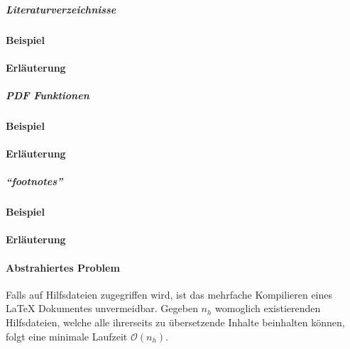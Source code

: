 \subparagraph*{Literaturverzeichnisse}
\paragraph*{Beispiel}
\paragraph*{Erläuterung}

\subparagraph*{PDF Funktionen}
\paragraph*{Beispiel}
\paragraph*{Erläuterung}

\subparagraph*{\enquote{footnotes}}
\paragraph*{Beispiel}
\paragraph*{Erläuterung}






\paragraph{Abstrahiertes Problem}
Falls auf Hilfsdateien zugegriffen wird, ist das mehrfache Kompilieren eines \LaTeX{} Dokumentes unvermeidbar. Gegeben $n_{h}$ womoglich existierenden Hilfsdateien, welche alle ihrerseits zu übersetzende Inhalte beinhalten können, folgt eine minimale Laufzeit $\mathcal{O}(n_h)$. 


